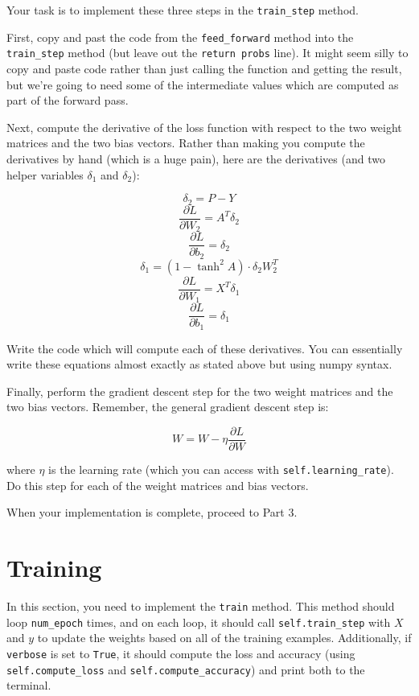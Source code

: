 \documentclass{article}
\begin{document}
Your task is to implement these three steps in the \texttt{train\_step} method.

First, copy and past the code from the \texttt{feed\_forward} method into the \texttt{train\_step} method (but leave out the \texttt{return probs} line). It might seem silly to copy and paste code rather than just calling the function and getting the result, but we're going to need some of the intermediate values which are computed as part of the forward pass.

Next, compute the derivative of the loss function with respect to the two weight matrices and the two bias vectors. Rather than making you compute the derivatives by hand (which is a huge pain), here are the derivatives (and two helper variables $\delta_1$ and $\delta_2$):

$$\delta_2 = P - Y$$
$$\frac{\partial L}{\partial W_2} = A^T \delta_2$$
$$\frac{\partial L}{\partial b_2} = \delta_2$$
$$\delta_1 = (1 - \tanh^2 A) \cdot \delta_2 W_2^T$$
$$\frac{\partial L}{\partial W_1} = X^T \delta_1$$
$$\frac{\partial L}{\partial b_1} = \delta_1$$

\noindent
Write the code which will compute each of these derivatives. You can essentially write these equations almost exactly as stated above but using numpy syntax.

Finally, perform the gradient descent step for the two weight matrices and the two bias vectors. Remember, the general gradient descent step is:

$$W = W - \eta \frac{\partial L}{\partial W}$$

\noindent
where $\eta$ is the learning rate (which you can access with \texttt{self.learning\_rate}). Do this step for each of the weight matrices and bias vectors.

When your implementation is complete, proceed to Part 3.

\section{Training}

In this section, you need to implement the \texttt{train} method. This method should loop \texttt{num\_epoch} times, and on each loop, it should call \texttt{self.train\_step} with $X$ and $y$ to update the weights based on all of the training examples. Additionally, if \texttt{verbose} is set to \texttt{True}, it should compute the loss and accuracy (using \texttt{self.compute\_loss} and \texttt{self.compute\_accuracy}) and print both to the terminal.
\end{document}
